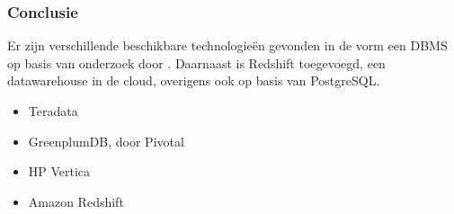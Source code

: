 \subsubsection{\textbf{Conclusie}}

Er zijn verschillende beschikbare technologieën gevonden in de vorm een DBMS op basis van onderzoek door \textcite{dewitt2006build}. Daarnaast is Redshift toegevoegd, een datawarehouse in de cloud, overigens ook op basis van PostgreSQL.


\begin{itemize}
    \item Teradata
    \item GreenplumDB, door Pivotal
    \item HP Vertica
    \item Amazon Redshift
\end{itemize}



